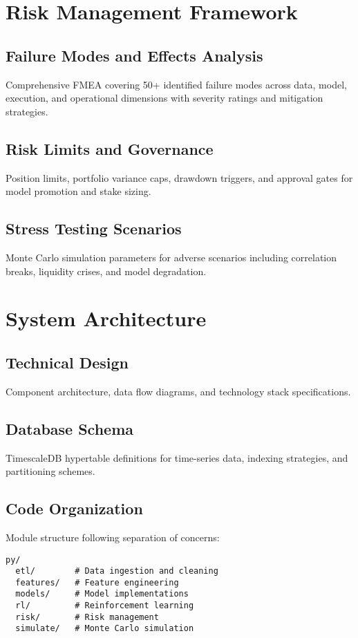 \documentclass[12pt,letterpaper]{report}
\theoremstyle{definition}
\begin{document}
\chapter{Risk Management Framework}

\section{Failure Modes and Effects Analysis}
Comprehensive FMEA covering 50+ identified failure modes across data, model, execution, and operational dimensions with severity ratings and mitigation strategies.

\section{Risk Limits and Governance}
Position limits, portfolio variance caps, drawdown triggers, and approval gates for model promotion and stake sizing.

\section{Stress Testing Scenarios}
Monte Carlo simulation parameters for adverse scenarios including correlation breaks, liquidity crises, and model degradation.

\chapter{System Architecture}

\section{Technical Design}
Component architecture, data flow diagrams, and technology stack specifications.

\section{Database Schema}
TimescaleDB hypertable definitions for time-series data, indexing strategies, and partitioning schemes.

\section{Code Organization}
Module structure following separation of concerns:
\begin{verbatim}
py/
  etl/        # Data ingestion and cleaning
  features/   # Feature engineering
  models/     # Model implementations
  rl/         # Reinforcement learning
  risk/       # Risk management
  simulate/   # Monte Carlo simulation
\end{verbatim}
\end{document}
